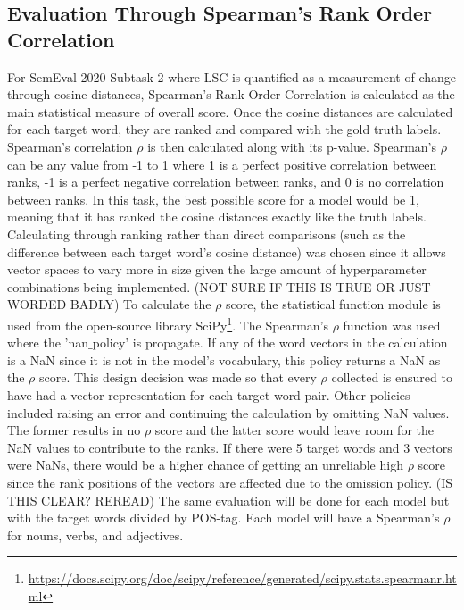 \subsection{Evaluation Through Spearman's Rank Order Correlation}
For SemEval-2020 Subtask 2 where LSC is quantified as a measurement of change through cosine distances, Spearman’s Rank Order Correlation is calculated as the main statistical measure of overall score. Once the cosine distances are calculated for each target word, they are ranked and compared with the gold truth labels. Spearman's correlation $\rho$ is then calculated along with its p-value. Spearman’s $\rho$ can be any value from -1 to 1 where 1 is a perfect positive correlation between ranks, -1 is a perfect negative correlation between ranks, and 0 is no correlation between ranks. In this task, the best possible score for a model would be 1, meaning that it has ranked the cosine distances exactly like the truth labels. Calculating through ranking rather than direct comparisons (such as the difference between each target word’s cosine distance) was chosen since it allows vector spaces to vary more in size given the large amount of hyperparameter combinations being implemented. (NOT SURE IF THIS IS TRUE OR JUST WORDED BADLY) To calculate the $\rho$ score, the statistical function module is used from the open-source library SciPy\footnote{\url{https://docs.scipy.org/doc/scipy/reference/generated/scipy.stats.spearmanr.html}}. The Spearman's $\rho$ function was used where the 'nan$\_$policy' is propagate. If any of the word vectors in the calculation is a NaN since it is not in the model's vocabulary, this policy returns a NaN as the $\rho$ score. This design decision was made so that every $\rho$ collected is ensured to have had a vector representation for each target word pair. Other policies included raising an error and continuing the calculation by omitting NaN values. The former results in no $\rho$ score and the latter score would leave room for the NaN values to contribute to the ranks. If there were 5 target words and 3 vectors were NaNs, there would be a higher chance of getting an unreliable high $\rho$ score since the rank positions of the vectors are affected due to the omission policy. (IS THIS CLEAR? REREAD) The same evaluation will be done for each model but with the target words divided by POS-tag. Each model will have a Spearman’s $\rho$ for nouns, verbs, and adjectives. 

